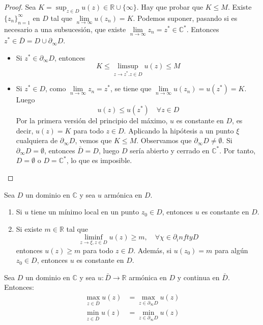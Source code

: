 \begin{proof}
    Sea $K = \sup_{z \in D} u(z) \in \mathbb{R} \cup \{\infty\}$.
    Hay que probar que $K \leq M$.
    Existe $\{z_n\}_{n=1}^\infty$ en $D$ tal que $\lim\limits_{n \to \infty} u(z_n) = K$.
    Podemos suponer, pasando si es necesario a una subsucesión, que existe $\lim\limits_{n \to \infty} z_n = z^\ast \in \mathbb{C}^\ast$.
    Entonces $z^\ast \in \bar{D} = D \cup \partial_\infty D$.
    \begin{itemize}
        \item Si $z^\ast \in \partial_\infty D$, entonces
              $$K \leq \limsup_{z \to z^\ast. z \in D} u(z) \leq M$$
        \item Si $z^\ast \in D$, como $\lim\limits_{n \to \infty} z_n = z^\ast$, se tiene que $\lim\limits_{n \to \infty} u(z_n) = u(z^\ast) = K$.
              Luego
              $$u(z) \leq u(z^\ast) \quad \forall z \in D$$
              Por la primera versión del principio del máximo, $u$ es constante en $D$, es decir, $u(z) = K$ para todo $z \in D$.
              Aplicando la hipótesis a un punto $\xi$ cualquiera de $\partial_\infty D$, vemos que $K \leq M$.
              Observamos que $\partial_\infty D \neq \emptyset$.
              Si $\partial_\infty D = \emptyset$, entonces $\bar{D} = D$, luego $D$ sería abierto y cerrado en $\mathbb{C}^\ast$.
              Por tanto, $D = \emptyset$ o $D = \mathbb{C}^\ast$, lo que es imposible.
    \end{itemize}
\end{proof}

\begin{theorem}
    Sea $D$ un dominio en $\mathbb{C}$ y sea $u$ armónica en $D$.
    \begin{enumerate}
        \item Si $u$ tiene un mínimo local en un punto $z_0 \in D$, entonces $u$ es constante en $D$.
        \item Si existe $m \in \mathbb{R}$ tal que
              $$\liminf_{z \to \xi, z \in D} u(z) \geq m, \quad \forall \chi \in \partial_infty D$$
              entonces $u(z) \geq m$ para todo $z \in D$.
              Además, si $u(z_0) = m$ para algún $z_0 \in D$, entonces $u$ es constante en $D$.
    \end{enumerate}
\end{theorem}

\begin{corollary}
    Sea $D$ un dominio en $\mathbb{C}$ y sea $u: \bar{D} \to \mathbb{R}$ armónica en $D$ y continua en $\bar{D}$.
    Entonces:
    \begin{align*}
        \max_{z \in \bar{D}} u(z) & = \max_{z \in \partial_\infty D} u(z) \\
        \min_{z \in \bar{D}} u(z) & = \min_{z \in \partial_\infty D} u(z)
    \end{align*}
\end{corollary}

